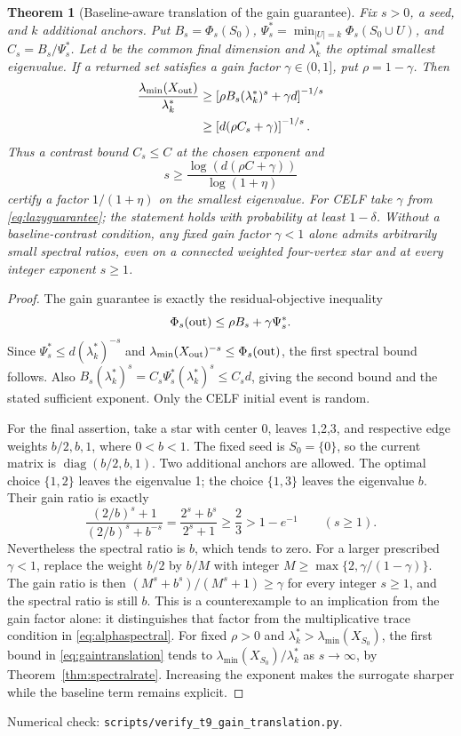 \documentclass[11pt]{article}
\newtheorem{theorem}{Theorem}
\DeclareMathOperator{\diag}{diag}
\begin{document}
\begin{theorem}[Baseline-aware translation of the gain guarantee]\label{thm:gaintranslation}
Fix $s>0$, a seed, and $k$ additional anchors. Put
$B_s=\Phi_s(S_0)$, $\Psi_s^*=\min_{|U|=k}\Phi_s(S_0\cup U)$,
and $C_s=B_s/\Psi_s^*$. Let $d$ be the common final dimension
and $\lambda_k^*$ the optimal smallest eigenvalue.
If a returned set satisfies a gain factor $\gamma\in(0,1]$, put
$\rho=1-\gamma$. Then
\begin{align}
 \frac{\lambda_{\min}(X_{\rm out})}{\lambda_k^*}
 &\geq\left[\rho B_s(\lambda_k^*)^s+\gamma d\right]^{-1/s}
 \label{eq:gaintranslation}\\
 &\geq\left[d(\rho C_s+\gamma)\right]^{-1/s}.\notag
\end{align}
Thus a contrast bound $C_s\leq C$ at the chosen exponent and
\[
 s\geq\frac{\log(d(\rho C+\gamma))}{\log(1+\eta)}
\]
certify a factor $1/(1+\eta)$ on the smallest eigenvalue.
For CELF take $\gamma$ from \eqref{eq:lazyguarantee}; the statement
holds with probability at least $1-\delta$.
Without a baseline-contrast condition, any fixed gain factor
$\gamma<1$ alone admits arbitrarily small spectral ratios, even on
a connected weighted four-vertex star and at every integer exponent
$s\geq1$.
\end{theorem}
\begin{proof}
The gain guarantee is exactly the residual-objective inequality
\[
 \Phi_s({\rm out})\leq\rho B_s+\gamma\Psi_s^*.
\]
Since $\Psi_s^*\leq d(\lambda_k^*)^{-s}$ and
$\lambda_{\min}(X_{\rm out})^{-s}\leq\Phi_s({\rm out})$,
the first spectral bound follows. Also
$B_s(\lambda_k^*)^s=C_s\Psi_s^*(\lambda_k^*)^s\leq C_s d$,
giving the second bound and the stated sufficient exponent.
Only the CELF initial event is random.

For the final assertion, take a star with center 0, leaves 1,2,3,
and respective edge weights $b/2,b,1$, where $0<b<1$. The fixed
seed is $S_0=\{0\}$, so the current matrix is
$\diag(b/2,b,1)$. Two additional anchors are allowed.
The optimal choice $\{1,2\}$ leaves the eigenvalue 1; the choice
$\{1,3\}$ leaves the eigenvalue $b$.
Their gain ratio is exactly
\[
 \frac{(2/b)^s+1}{(2/b)^s+b^{-s}}
 =\frac{2^s+b^s}{2^s+1}\geq\frac23>1-e^{-1}
 \qquad(s\geq1).
\]
Nevertheless the spectral ratio is $b$, which tends to zero.
For a larger prescribed $\gamma<1$, replace the weight $b/2$ by
$b/M$ with integer $M\geq\max\{2,\gamma/(1-\gamma)\}$.
The gain ratio is then $(M^s+b^s)/(M^s+1)\geq\gamma$ for
every integer $s\geq1$, and the spectral ratio is still $b$.
This is a counterexample to an implication from the gain factor
alone: it distinguishes that factor from the multiplicative
trace condition in \eqref{eq:alphaspectral}.
For fixed $\rho>0$ and $\lambda_k^*>\lambda_{\min}(X_{S_0})$,
the first bound in \eqref{eq:gaintranslation} tends to
$\lambda_{\min}(X_{S_0})/\lambda_k^*$ as $s\to\infty$, by
Theorem~\ref{thm:spectralrate}. Increasing the exponent makes the
surrogate sharper while the baseline term remains explicit.
\end{proof}
\noindent Numerical check: \texttt{scripts/verify\_t9\_gain\_translation.py}.
\end{document}
